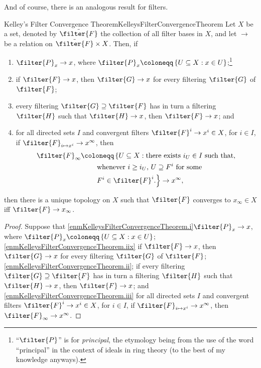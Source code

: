 And of course, there is an analogous result for filters.
\begin{thm}{Kelley's Filter Convergence Theorem}{KelleysFilterConvergenceTheorem}
Let $X$ be a set, denoted by $\tilde{\filter{F}}$ the collection of all filter bases in $X$, and let $\to$ be a relation on $\tilde{\filter{F}}\times X$.  Then, if
\begin{enumerate}
\item \label{enmKelleysFilterConvergenceTheorem.i}$\filter{P}_x\to x$, where $\filter{P}_x\coloneqq \left\{ U\subseteq X:x\in U\right\}$;\footnote{``$\filter{P}$'' is for \emph{principal}, the etymology being from the use of the word ``principal'' in the context of ideals in ring theory (to the best of my knowledge anyways).}
\item \label{enmKelleysFilterConvergenceTheorem.iix}if $\filter{F}\to x$, then $\filter{G}\to x$ for every filtering $\filter{G}$ of $\filter{F}$;
\item \label{enmKelleysFilterConvergenceTheorem.ii}every filtering $\filter{G}\supseteq \filter{F}$ has in turn a filtering $\filter{H}$ such that $\filter{H}\to x$, then $\filter{F}\to x$; and
\item \label{enmKelleysFilterConvergenceTheorem.iii}for all directed sets $I$ and convergent filters $\filter{F}^i\to x^i\in X$, for $i\in I$, if $\filter{F}_{i\mapsto x^i}\to x^\infty$, then
\begin{equation}
\begin{split}
\filter{F}_\infty & \coloneqq \left\{ U\subseteq X:\text{there exists }i_U\in I\text{ such that,}\right. \\
& \qquad \left. \text{whenever }i\geq i_U\text{, }U\supseteq F^i\text{ for some}\right. \\ & \qquad \left. F^i\in \filter{F}^i\text{.}\right\} \to x^\infty ,
\end{split}
\end{equation}
\end{enumerate}
then there is a unique topology on $X$ such that $\filter{F}$ converges to $x_\infty \in X$ iff $\filter{F}\to x_\infty$.
\begin{proof}
Suppose that \cref{enmKelleysFilterConvergenceTheorem.i}$\filter{P}_x\to x$, where $\filter{P}_x\coloneqq \left\{ U\subseteq X:x\in U\right\}$; \cref{enmKelleysFilterConvergenceTheorem.iix} if $\filter{F}\to x$, then $\filter{G}\to x$ for every filtering $\filter{G}$ of $\filter{F}$; \cref{enmKelleysFilterConvergenceTheorem.ii}; if every filtering $\filter{G}\supseteq \filter{F}$ has in turn a filtering $\filter{H}$ such that $\filter{H}\to x$, then $\filter{F}\to x$; and \cref{enmKelleysFilterConvergenceTheorem.iii} for all directed sets $I$ and convergent filters $\filter{F}^i\to x^i\in X$, for $i\in I$, if $\filter{F}_{i\mapsto x^i}\to x^\infty$, then $\filter{F}_\infty \to x^\infty$.


\end{proof}
\end{thm}
